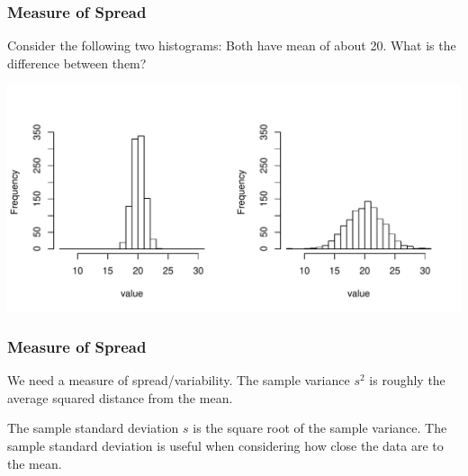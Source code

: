 \documentclass[handout]{beamer}
\newcommand{\blue}[1]{\textcolor{blue2}{#1}}
\begin{document}
\begin{frame}[fragile]
\frametitle{Measure of Spread}

Consider the following two histograms:  Both have mean of about 20.  What is the difference between them?

\begin{center}
\pause \includegraphics[width=\textwidth]{figure/spread.pdf}
\end{center}

\end{frame}


\begin{frame}[fragile]
\frametitle{Measure of Spread}

We need a measure of \blue{spread/variability}.  The \blue{sample variance $s^2$} is roughly the average squared distance from the mean.  

\vspace{0.5cm}

The \blue{sample standard deviation $s$} is the square root of the sample variance. The sample standard deviation is useful when considering how close the data are to the mean.

\end{frame}
\end{document}
